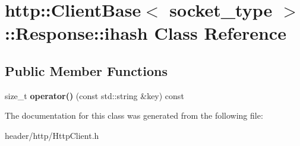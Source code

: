 \hypertarget{classhttp_1_1_client_base_1_1_response_1_1ihash}{}\section{http\+:\+:Client\+Base$<$ socket\+\_\+type $>$\+:\+:Response\+:\+:ihash Class Reference}
\label{classhttp_1_1_client_base_1_1_response_1_1ihash}
\subsection*{Public Member Functions}
\begin{DoxyCompactItemize}
\item 
\mbox{\label{classhttp_1_1_client_base_1_1_response_1_1ihash_aabba60d960eb1ca18468e2a0d647c98e}} 
size\+\_\+t {\bfseries operator()} (const std\+::string \&key) const
\end{DoxyCompactItemize}


The documentation for this class was generated from the following file\+:\begin{DoxyCompactItemize}
\item 
header/http/Http\+Client.\+h\end{DoxyCompactItemize}
